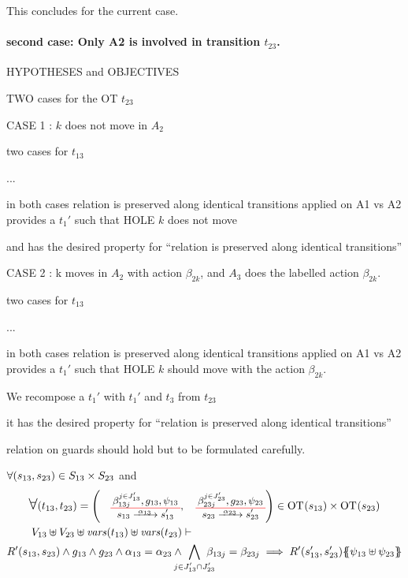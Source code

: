 \documentclass[runningheads]{llncs}
\begin{document}
\begin{enumerate}
This concludes for the current case.

\paragraph{second case: Only A2 is involved in transition $t_{23}$.}

HYPOTHESES and OBJECTIVES

TWO cases for the OT $t_{23}$

CASE 1 : $k$ does not move in $A_2$

two cases for  $t_{13}$

 ...

in both cases relation is preserved along identical transitions applied on A1 vs A2 provides a $t_{1}'$ such that HOLE $k$ does not move

and has the desired property for ``relation is preserved along identical transitions''

CASE 2 : k moves in $A_2$ with action $\beta_{2 k}$, and $A_3$ does the labelled action $\beta_{2 k}$.

two cases for  $t_{13}$

 ...

in both cases relation is preserved along identical transitions applied on A1 vs A2 provides a $t_{1}'$ such that HOLE $k$ should move with the action $\beta_{2 k}$.

We recompose a $t_{1}'$ with $t_{1}'$ and $t_3$ from  $t_{23}$

it has the desired property for ``relation is preserved along identical transitions''

relation on guards should hold but to be formulated carefully.

 $\forall {\left(s_{13}, s_{23}\right)} \in S_{13} \times S_{23}$ and
\begin{multline*}
 \bigsymb{\forall} \mpar{t_{13}, t_{23}} = \mpar{\OTx{13}{}{13}{13}, \OTx{23}{}{23}{23}} \in \fOT{s_{13}} \times \fOT{s_{23}} \\  V_{13} \uplus V_{23} \uplus \fvars{t_{13}} \uplus \fvars{t_{23}} \vdash \hspace{6cm}\\  R'\mpar{s_{13}, s_{23}} \wedge 	g_{13} \wedge g_{23} \wedge \alpha_{13} = \alpha_{23} \wedge \bigwedge_\subbox{j \in J'_{13} \cap J'_{23}} \beta_{13j} = \beta_{23j} \implies  R'\mpar{s'_{13}, s'_{23}}\psubst{\psi_{13} \uplus \psi_{23}}\\
\end{multline*}


\end{enumerate}
\end{document}
